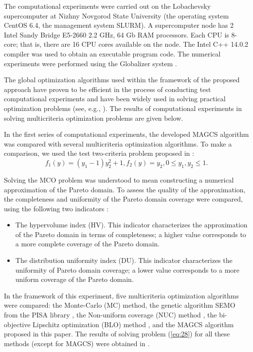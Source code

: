 \documentclass[smallextended]{svjour3}       %
\begin{document}
The computational experiments were carried out on the Lobachevsky supercomputer at Nizhny Novgorod State University (the operating system CentOS 6.4, the management system SLURM). A supercomputer node has 2 Intel Sandy Bridge E5-2660 2.2 GHz, 64 Gb RAM processors. Each CPU is 8-core; that is, there are 16 CPU cores available on the node. The Intel C++ 14.0.2 compiler was used to obtain an executable program code. The numerical experiments were performed using the Globalizer system \cite{c32}.

The global optimization algorithms used within the framework of the proposed approach have proven to be efficient in the process of conducting test computational experiments and have been widely used in solving practical optimization problems (see, e.g., \cite{c33,c34}). The results of computational experiments in solving multicriteria optimization problems are given below.

In the first series of computational experiments, the developed MAGCS algorithm was compared with several multicriteria optimization algorithms. To make a comparison, we used the test two-criteria problem proposed in \cite{c35}:
\begin{equation}\label{eq:28}
f_1 (y)=(y_1-1) y_2^2+1,f_2 (y)=y_2, 0\leq y_1,y_2 \leq 1.
\end{equation}


Solving the MCO problem was understood to mean constructing a numerical approximation of the Pareto domain. To assess the quality of the approximation, the completeness and uniformity of the Pareto domain coverage were compared, using the following two indicators \cite{c35,c36}:
\begin{itemize}
	\item 	The hypervolume index (HV). This indicator characterizes the approximation of the Pareto domain in terms of completeness; a higher value corresponds to a more complete coverage of the Pareto domain.
	\item The distribution uniformity index (DU). This indicator characterizes the uniformity of Pareto domain coverage; a lower value corresponds to a more uniform coverage of the Pareto domain.
\end{itemize}
	
In the framework of this experiment, five multicriteria optimization algorithms were compared: the Monte-Carlo (MC) method, the genetic algorithm SEMO from the PISA library \cite{c9,c36}, the Non-uniform coverage (NUC) method \cite{c35}, the bi-objective Lipschitz optimization (BLO) method \cite{c36}, and the MAGCS algorithm proposed in this paper. The results of solving problem (\ref{eq:28}) for all these methods (except for MAGCS) were obtained in \cite{c36}.
\end{document}
